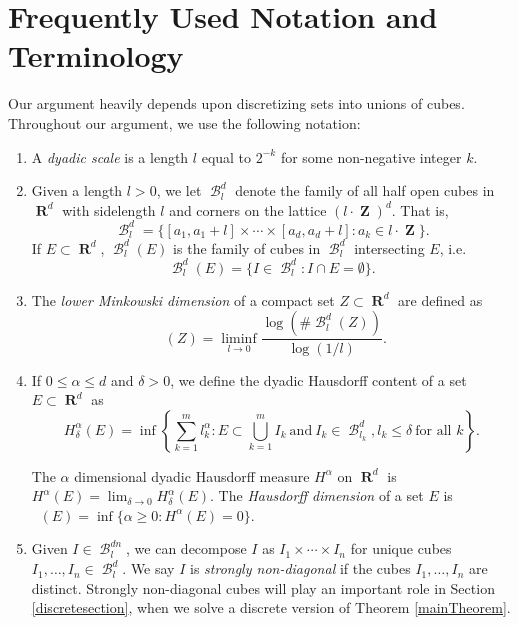\documentclass[dvipsnames,letterpaper,12pt]{article}
\numberwithin{equation}{section}
\theoremstyle{plain}
\DeclareMathOperator{\hausdim}{\dim_{\mathbf{H}}}
\DeclareMathOperator{\lowminkdim}{\underline{\dim}_{\mathbf{M}}}
\DeclareMathOperator{\RR}{\mathbf{R}}
\DeclareMathOperator{\ZZ}{\mathbf{Z}}
\DeclareMathOperator{\B}{\mathcal{B}}
\begin{document}
\section{Frequently Used Notation and Terminology}\label{notationSection}

Our argument heavily depends upon discretizing sets into unions of cubes. Throughout our argument, we use the following notation:


\begin{enumerate}%
	\item A {\it dyadic scale} is a length $l$ equal to $2^{-k}$ for some non-negative integer $k$.

	\item Given a length $l > 0$, we let $\B^d_l$  denote the family of all half open cubes in $\RR^d$ with sidelength $l$ and corners on the lattice $(l \cdot \ZZ)^d$. That is,
	\[ \B^d_l = \{ [a_1, a_1 + l] \times \cdots \times [a_d, a_d+l] : a_k \in l \cdot \ZZ \}. \]
	If $E \subset \RR^d$, $\B^d_l(E)$ is the family of cubes in $\B^d_l$ intersecting $E$, i.e.
	\[ \B^d_l(E) = \{ I \in \B^d_l: I \cap E = \emptyset \}. \]

	\item The {\it lower Minkowski dimension} of a compact set $Z \subset \RR^d$ are defined as
\[		\lowminkdim(Z) = \liminf_{l \to 0} \frac{\log(\# \B^d_l(Z))}{\log(1/l)}. \]

	\item If $0\leq\alpha\leq d$ and $\delta>0$, we define the dyadic Hausdorff content of a set $E\subset\RR^d$ as 
	\[ H^\alpha_\delta(E) = \inf \left\{ \sum_{k = 1}^m l_k^\alpha : E \subset \bigcup_{k = 1}^m I_k\ \text{and}\ I_k \in \B^d_{l_k}, l_k \leq \delta\ \text{for all $k$} \right\}. \]


	The $\alpha$ dimensional dyadic Hausdorff measure $H^\alpha$ on $\RR^d$ is $H^\alpha(E) = \lim_{\delta \to 0} H_\delta^\alpha(E)$. 
	The {\it Hausdorff dimension} of a set $E$ is $\hausdim(E) = \inf \{ \alpha \geq 0 : H^\alpha(E) = 0 \}$.


	\item \label{stronglyNonDiagonalDef}Given $I \in \B^{dn}_l$, we can decompose $I$ as $I_1 \times \cdots \times I_n$ for unique cubes $I_1, \dots, I_n \in \B_l^d$. We say $I$ is {\it strongly non-diagonal} if the cubes $I_1, \dots, I_n$ are distinct. Strongly non-diagonal cubes will play an important role in Section \ref{discretesection}, when we solve a discrete version of Theorem \ref{mainTheorem}. 


\end{enumerate}
\end{document}
